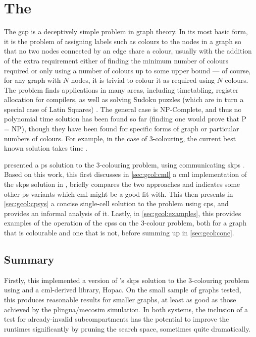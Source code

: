 \newcommand{\bo}{\(b\)}

\chapter{\label{chap:gcol}The }

The \gls{gcp} is a deceptively simple problem in graph theory.  In its most basic form, it is the problem of assigning labels such as colours to the nodes in a graph so that no two nodes connected by an edge share a colour, usually with the addition of the extra requirement either of finding the minimum number of colours required or only using a number of colours up to some upper bound --- of course, for any graph with \(N\) nodes, it is trivial to colour it as required using \(N\) colours.  The problem finds applications in many areas, including timetabling, register allocation for compilers, as well as solving Sudoku puzzles (which are in turn a special case of Latin Squares) \cite{Lewis2016}.  The general case is NP-Complete, and thus no polynomial time solution has been found so far (finding one would prove that P = NP), though they have been found for specific forms of graph or particular numbers of colours.  For example, in the case of 3-colouring, the current best known solution takes  time \cite{Beigel2005}.

\citeauthor{Gheorghe2013} presented a \gls{ps} solution to the 3-colouring problem, using communicating \gls{skps} \cite{Gheorghe2013}.  Based on this work, this  first discusses in \cref{sec:gcol:cml} a \gls{cml} implementation of the \gls{skps} solution in \cite{Gheorghe2013}, briefly compares the two approaches and indicates some other \gls{ps} variants which \gls{cml} might be a good fit with.  This  then presents in \cref{sec:gcol:cpsys} a concise single-cell solution to the problem using \gls{cps}, and provides an informal analysis of it.  Lastly, in \cref{sec:gcol:examples}, this  provides examples of the operation of the \glspl{cps} on the 3-colour problem, both for a graph that is colourable and one that is not, before summing up in \cref{sec:gcol:conc}.






\section{\label{sec:gcol:conc}Summary}
Firstly, this  implemented a version of \citeauthor{Gheorghe2013}'s \gls{skps} solution to the 3-colouring problem using \fsharp{} and a \gls{cml}-derived library, Hopac.   On the small sample of graphs tested, this produces reasonable results for smaller graphs, at least as good as those achieved by the \gls{plingua}/\gls{mecosim} simulation.  In both systems, the inclusion of a test for already-invalid subcompartments has the potential to improve the runtimes significantly by pruning the search space, sometimes quite dramatically.

